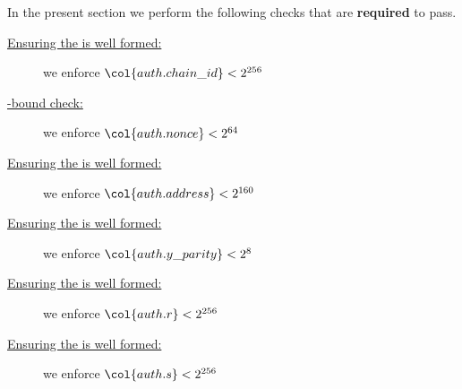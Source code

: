 In the present section we perform the following checks that are \textbf{required} to pass.
\begin{description}
	\item[\underline{Ensuring the  is well formed:}] 
		we enforce $\col{auth.chain\_id} < 2^{256}$
	\item[\underline{\cite{EIP-2681}-bound  check:}]
		we enforce $\col{auth.nonce} < 2^{64}$
	\item[\underline{Ensuring the  is well formed:}] 
		we enforce $\col{auth.address} < 2^{160}$
	\item[\underline{Ensuring the  is well formed:}] 
		we enforce $\col{auth.y\_parity} < 2^{8}$
	\item[\underline{Ensuring the  is well formed:}] 
		we enforce $\col{auth.r} < 2^{256}$
	\item[\underline{Ensuring the  is well formed:}] 
		we enforce $\col{auth.s} < 2^{256}$
\end{description}
